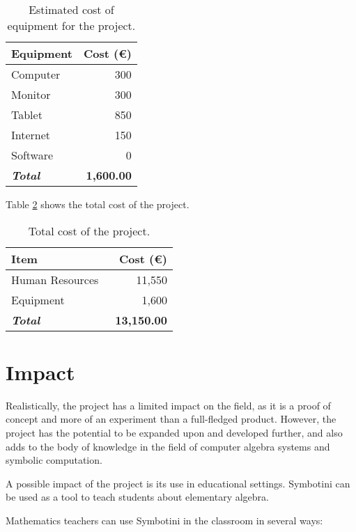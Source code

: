 \begin{table}[H]
    \begin{tabular}{l r}
        \hline
        \textbf{Equipment} & \textbf{Cost (€)} \\
        \hline
        Computer & 300 \\
        Monitor & 300 \\
        Tablet & 850 \\
        Internet & 150 \\
        Software & 0 \\
        \hline
        \textbf{\textit{Total}} & \textbf{1,600.00} \\
        \hline
    \end{tabular}
    \caption{Estimated cost of equipment for the project.}
    \label{tab:equipment}
\end{table}

Table \ref{tab:total-cost} shows the total cost of the project.

\begin{table}[H]
    \begin{tabular}{l r}
        \hline
        \textbf{Item} & \textbf{Cost (€)} \\
        \hline
        Human Resources & 11,550 \\
        Equipment & 1,600 \\
        \hline
        \textbf{\textit{Total}} & \
        \textbf{13,150.00} \\
        \hline
    \end{tabular}
    \caption{Total cost of the project.}
    \label{tab:total-cost}
\end{table}

\section{Impact}\label{sec:impact}

Realistically, the project has a limited impact on the field, as it is a proof of concept and more of an experiment than a full-fledged product. However, the project has the potential to be expanded upon and developed further, and also adds to the body of knowledge in the field of computer algebra systems and symbolic computation.

A possible impact of the project is its use in educational settings. Symbotini can be used as a tool to teach students about elementary algebra.

Mathematics teachers can use Symbotini in the classroom in several ways:


